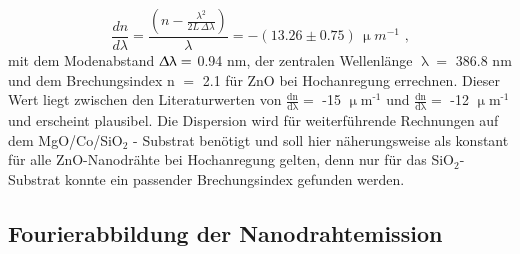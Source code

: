 \begin{equation}
\frac{dn}{d\lambda}=\frac{\left(n -\frac{\lambda^2}{2L\, \Delta\lambda}\right)}{\lambda} = -(13.26 \pm 0.75)\, \upmu m^{-1} \text{ ,} 
\label{Disp}
\end{equation}
mit dem Modenabstand $\Updelta\uplambda=$ 0.94 nm, der zentralen Wellenlänge $\uplambda=$ 386.8 nm und dem \mbox{Brechungsindex} n $=$ 2.1 für ZnO bei Hochanregung \cite{Wille.2016} errechnen. Dieser Wert liegt zwischen den Literaturwerten von $\frac{\text{dn}}{\text{d}\uplambda}=$ -15 $\upmu$m$^\text{-1}$ \cite{O.Madelung.1984} und $\frac{\text{dn}}{\text{d}\uplambda}=$ -12 $\upmu$m$^\text{-1}$ \cite{Zimmler.2010} und erscheint plausibel. Die Dispersion wird für weiterführende Rechnungen auf dem MgO/Co/SiO$_\text{2}$ - Substrat benötigt und soll hier näherungsweise als konstant für alle ZnO-Nanodrähte bei Hochanregung gelten, denn nur für das SiO$_\text{2}$-Substrat konnte ein passender Brechungsindex gefunden werden.
\subsection{Fourierabbildung der Nanodrahtemission}
